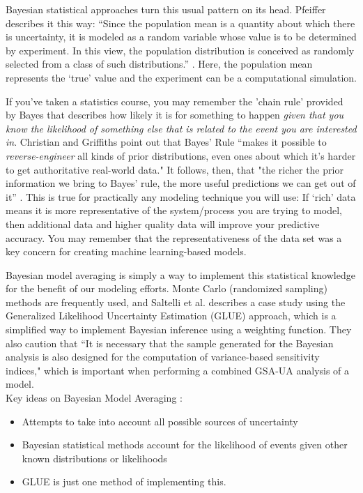 \documentclass[10pt]{article}
\begin{document}
Bayesian statistical approaches turn this usual pattern on its head. Pfeiffer describes it this way: ``Since the population mean is a quantity about which there is uncertainty, it is modeled as a random variable whose value is to be determined by experiment. In this view, the population distribution is conceived as randomly selected from a class of such distributions.'' \cite{Pfeiffer2009-prob}. Here, the population mean represents the `true' value and the experiment can be a computational simulation. 

If you've taken a statistics course, you may remember the 'chain rule' provided by Bayes that describes how likely it is for something to happen \textit{given that you know the likelihood of something else that is related to the event you are interested in}. Christian and Griffiths \cite{Christian2016-ug} point out that Bayes' Rule ``makes it possible to \textit{reverse-engineer} all kinds of prior distributions, even ones about which it's harder to get authoritative real-world data." It follows, then, that "the richer the prior information we bring to Bayes' rule, the more useful predictions we can get out of it'' \cite{Christian2016-ug}. This is true for practically any modeling technique you will use: If `rich' data means it is more representative of the system/process you are trying to model, then additional data and higher quality data will improve your predictive accuracy. You may remember that the representativeness of the data set was a key concern for creating machine learning-based models.

Bayesian model averaging is simply a way to implement this statistical knowledge for the benefit of our modeling efforts. Monte Carlo (randomized sampling) methods are frequently used, and Saltelli et al. \cite{Saltelli2004-ga} describes a case study using the Generalized Likelihood Uncertainty Estimation (GLUE) approach, which is a simplified way to implement Bayesian inference using a weighting function. They also caution that ``It is necessary that the sample generated for the Bayesian analysis is also designed for the computation of variance-based sensitivity indices," \cite{Saltelli2004-ga} which is important when performing a combined GSA-UA analysis of a model. \\

\noindent{}
Key ideas on Bayesian Model Averaging  \cite{Saltelli2004-ga}:
\begin{itemize}
\item Attempts to take into account all possible sources of uncertainty
\item Bayesian statistical methods account for the likelihood of events given other known distributions or likelihoods
\item  GLUE \cite{Saltelli2004-ga, Blasone2008-av} is just one method of implementing this.
\end{itemize}
\end{document}
